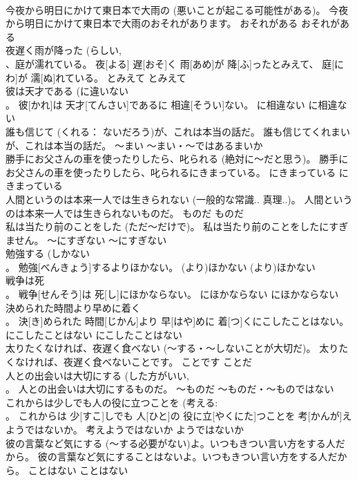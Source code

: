 \documentclass[8pt]{extreport}
\begin{document}
\begin{CJK}{UTF8}{min}
\\	今夜から明日にかけて東日本で大雨の (悪いことが起こる可能性がある)。	今夜から明日にかけて東日本で大雨のおそれがあります。	おそれがある	おそれがある	
\\	夜遅く雨が降った (らしい, 
\\	、庭が濡れている。	夜[よる] 遅[おそ]く 雨[あめ]が 降[ふ]ったとみえて、 庭[にわ]が 濡[ぬ]れている。	とみえて	とみえて	
\\	彼は天才である (に違いない 
\\	。	彼[かれ]は 天才[てんさい]であるに 相違[そうい]ない。	に相違ない	に相違ない	
\\	誰も信じて (くれる： ないだろう)が、これは本当の話だ。	誰も信じてくれまいが、これは本当の話だ。	～まい	～まい・～ではあるまいか	
\\	勝手にお父さんの車を使ったりしたら、叱られる (絶対に～だと思う)。	勝手にお父さんの車を使ったりしたら、叱られるにきまっている。	にきまっている	にきまっている	
\\	人間というのは本来一人では生きられない (一般的な常識.. 真理..)。	人間というのは本来一人では生きられないものだ。	ものだ	ものだ	
\\	私は当たり前のことをした (ただ～だけで)。	私は当たり前のことをしたにすぎません。	～にすぎない	～にすぎない	
\\	勉強する (しかない 
\\	。	勉強[べんきょう]するよりほかない。	(より)ほかない	(より)ほかない	
\\	戦争は死 
\\	。	戦争[せんそう]は 死[し]にほかならない。	にほかならない	にほかならない	
\\	決められた時間より早めに着く 
\\	。	決[き]められた 時間[じかん]より 早[はや]めに 着[つ]くにこしたことはない。	にこしたことはない	にこしたことはない	
\\	太りたくなければ、夜遅く食べない (～する・～しないことが大切だ)。	太りたくなければ、夜遅く食べないことです。	ことです	ことだ	
\\	人との出会いは大切にする (した方がいい, 
\\	。	人との出会いは大切にするものだ。	～ものだ	～ものだ・～ものではない	
\\	これからは少しでも人の役に立つことを (考える: 
\\	。	これからは 少[すこ]しでも 人[ひと]の 役に立[やくにた]つことを 考[かんが]えようではないか。	考えようではないか	ようではないか	
\\	彼の言葉など気にする (～する必要がない)よ。いつもきつい言い方をする人だから。	彼の言葉など気にすることはないよ。いつもきつい言い方をする人だから。	ことはない	ことはない	

\end{CJK}
\end{document}
